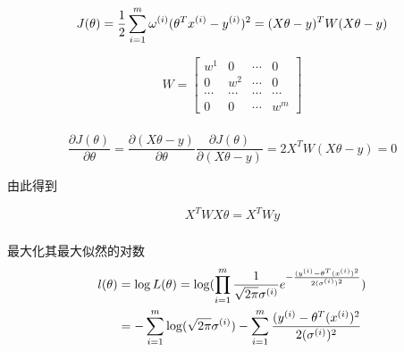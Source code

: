 \documentclass{ctexart}
\begin{document}
\subsection{}
\subsubsection{}
\begin{equation}
	J(\theta) = \frac{1}{2} \sum_{i=1}^{m} \omega^{(i)}(\theta^T x^{(i)} - y^{(i)})^2 = (X\theta - y)^T W(X\theta -y) \notag
\end{equation}

\begin{equation}
	W = \begin{bmatrix}
	w^{1} & 0 & \cdots & 0 \\
	0 & w^{2} & \cdots & 0 \\
	\cdots& \cdots &\cdots & \cdots \\
	0 & 0 & \cdots & w^{m}
	\end{bmatrix}
\end{equation}

\subsubsection{}

\begin{equation}
	\frac{\partial J(\theta)}{\partial \theta} = \frac{\partial (X\theta - y)}{\partial \theta} \frac{\partial J(\theta)}{\partial (X\theta - y)} = 2X^TW(X\theta - y) = 0
\end{equation}

由此得到

\begin{equation}
	X^TWX\theta = X^TWy
\end{equation}

\subsubsection{}
最大化其最大似然的对数
\begin{align}
	l(\theta) &= \log L(\theta) = \log(\prod_{i=1}^m \frac{1}{\sqrt{2\pi}\sigma^{(i)}}e^{-\frac{(y^{(i)}-\theta^T(x^{(i)})^2}{2(\sigma^{(i)})^2}})  \notag \\
	&= -\sum_{i=1}^m\log(\sqrt{2\pi}\sigma^{(i)}) - \sum_{i=1}^m \frac{(y^{(i)}-\theta^T(x^{(i)})^2}{2(\sigma^{(i)})^2} \notag \\
\end{align}
\end{document}
